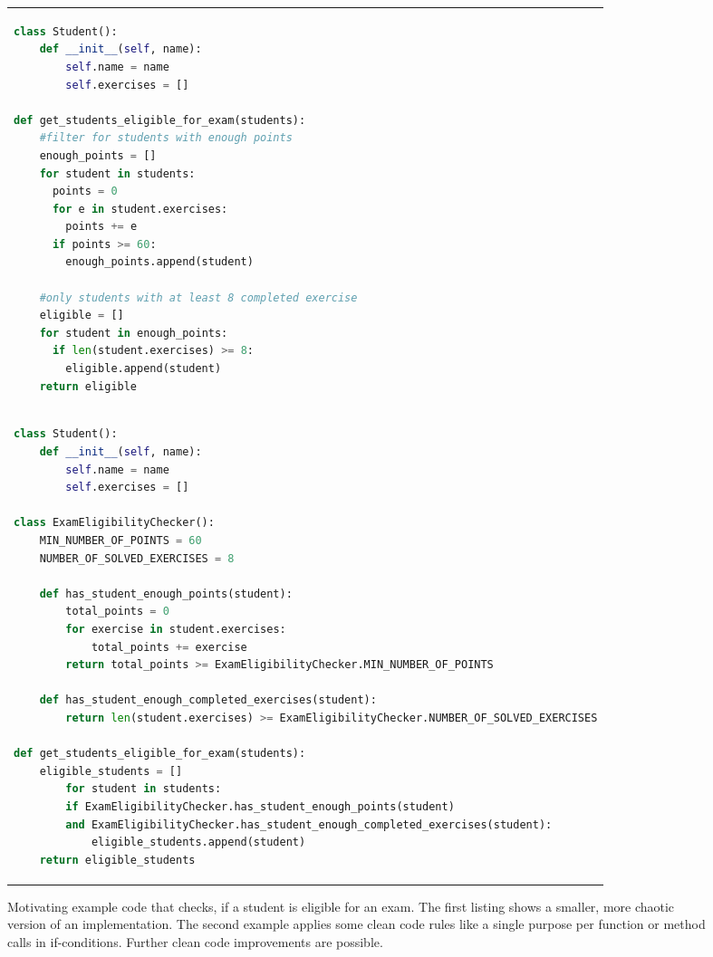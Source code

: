 \begin{figure}[h]
\begin{tabular}{p{\textwidth}}
\begin{minipage}{1\textwidth}
\centering
\begin{lstlisting}[basicstyle=\tiny, language=Python, label=lst:tokens_1, caption={}]
class Student():
    def __init__(self, name):
        self.name = name
        self.exercises = []

def get_students_eligible_for_exam(students):
    #filter for students with enough points
    enough_points = []
    for student in students:
      points = 0
      for e in student.exercises:
        points += e
      if points >= 60:
        enough_points.append(student)
    
    #only students with at least 8 completed exercise
    eligible = []
    for student in enough_points:
      if len(student.exercises) >= 8:
        eligible.append(student)
    return eligible
\end{lstlisting}
\end{minipage}
\\
\begin{minipage}[c]{1\textwidth}
\centering
\begin{lstlisting}[basicstyle=\tiny, language=Python, label=lst:tokens_2, caption={}]
class Student():
    def __init__(self, name):
        self.name = name
        self.exercises = []
    
class ExamEligibilityChecker():
    MIN_NUMBER_OF_POINTS = 60
    NUMBER_OF_SOLVED_EXERCISES = 8
    
    def has_student_enough_points(student):
        total_points = 0
        for exercise in student.exercises:
            total_points += exercise
        return total_points >= ExamEligibilityChecker.MIN_NUMBER_OF_POINTS
    
    def has_student_enough_completed_exercises(student):
        return len(student.exercises) >= ExamEligibilityChecker.NUMBER_OF_SOLVED_EXERCISES

def get_students_eligible_for_exam(students):
    eligible_students = []
        for student in students:
        if ExamEligibilityChecker.has_student_enough_points(student) 
        and ExamEligibilityChecker.has_student_enough_completed_exercises(student):
            eligible_students.append(student)
    return eligible_students    
\end{lstlisting}
\end{minipage}
\end{tabular}
\caption[Motivating example for clean code vs non-clean code]{Motivating example code that checks, if a student is eligible for an exam. The first listing shows a smaller, more chaotic version of an implementation. The second example applies some clean code rules like a single purpose per function or method calls in if-conditions. Further clean code improvements are possible.}
\label{list:motivating_example}
\end{figure}


